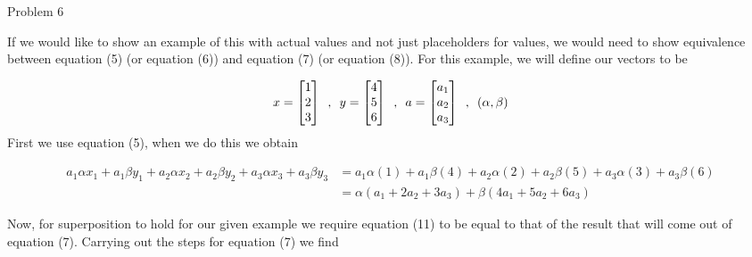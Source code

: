 \begin{problem}{Problem 6}
\begin{highlight}
        If we would like to show an example of this with actual values and not just placeholders for values, we would need to show equivalence between equation (5) (or equation (6)) and equation (7) 
        (or equation (8)). For this example, we will define our vectors to be 

        \begin{equation}
            x =
            \begin{bmatrix}
                1 \\
                2 \\
                3 \\
            \end{bmatrix}
            \hspace*{5pt} , \hspace*{5pt}
            y = 
            \begin{bmatrix}
                4 \\
                5 \\
                6 \\
            \end{bmatrix}
            \hspace*{5pt} , \hspace*{5pt}
            a = 
            \begin{bmatrix}
                a_{1} \\
                a_{2} \\
                a_{3} \\
            \end{bmatrix}
            \hspace*{5pt} , \hspace*{5pt} 
            (\alpha , \beta)
        \end{equation}
        First we use equation (5), when we do this we obtain

        \footnotesize
        \begin{align}
            a_{1} \alpha x_{1} + a_{1} \beta y_{1} + a_{2} \alpha x_{2} + a_{2} \beta y_{2} + a_{3} \alpha x_{3} + a_{3} \beta y_{3} & = a_{1} \alpha (1) + a_{1} \beta (4) + a_{2} \alpha (2) + a_{2} \beta (5) + a_{3} \alpha (3) + a_{3} \beta (6) \\
            & = \alpha (a_{1} + 2a_{2} + 3a_{3}) + \beta (4a_{1} + 5a_{2} + 6a_{3}) 
        \end{align}

        Now, for superposition to hold for our given example we require equation (11) to be equal to that of the result that will come out of equation (7). Carrying out the steps for equation (7)
        we find


\end{highlight}
\end{problem}
